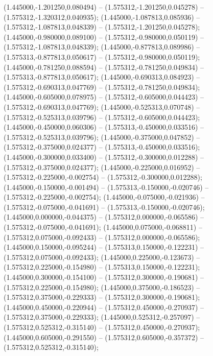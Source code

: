  (1.445000,-1.201250,0.080494) -- (1.575312,-1.201250,0.045278) -- (1.575312,-1.320312,0.040935);
 (1.445000,-1.087813,0.085936) -- (1.575312,-1.087813,0.048339) -- (1.575312,-1.201250,0.045278);
 (1.445000,-0.980000,0.089100) -- (1.575312,-0.980000,0.050119) -- (1.575312,-1.087813,0.048339);
 (1.445000,-0.877813,0.089986) -- (1.575313,-0.877813,0.050617) -- (1.575312,-0.980000,0.050119);
 (1.445000,-0.781250,0.088594) -- (1.575312,-0.781250,0.049834) -- (1.575313,-0.877813,0.050617);
 (1.445000,-0.690313,0.084923) -- (1.575312,-0.690313,0.047769) -- (1.575312,-0.781250,0.049834);
 (1.445000,-0.605000,0.078975) -- (1.575312,-0.605000,0.044423) -- (1.575312,-0.690313,0.047769);
 (1.445000,-0.525313,0.070748) -- (1.575312,-0.525313,0.039796) -- (1.575312,-0.605000,0.044423);
 (1.445000,-0.450000,0.060306) -- (1.575313,-0.450000,0.033516) -- (1.575312,-0.525313,0.039796);
 (1.445000,-0.375000,0.047852) -- (1.575312,-0.375000,0.024377) -- (1.575313,-0.450000,0.033516);
 (1.445000,-0.300000,0.033400) -- (1.575312,-0.300000,0.012288) -- (1.575312,-0.375000,0.024377);
 (1.445000,-0.225000,0.016952) -- (1.575312,-0.225000,-0.002754) -- (1.575312,-0.300000,0.012288);
 (1.445000,-0.150000,-0.001494) -- (1.575313,-0.150000,-0.020746) -- (1.575312,-0.225000,-0.002754);
 (1.445000,-0.075000,-0.021936) -- (1.575312,-0.075000,-0.041691) -- (1.575313,-0.150000,-0.020746);
 (1.445000,0.000000,-0.044375) -- (1.575312,0.000000,-0.065586) -- (1.575312,-0.075000,-0.041691);
 (1.445000,0.075000,-0.068811) -- (1.575312,0.075000,-0.092433) -- (1.575312,0.000000,-0.065586);
 (1.445000,0.150000,-0.095244) -- (1.575313,0.150000,-0.122231) -- (1.575312,0.075000,-0.092433);
 (1.445000,0.225000,-0.123673) -- (1.575312,0.225000,-0.154980) -- (1.575313,0.150000,-0.122231);
 (1.445000,0.300000,-0.154100) -- (1.575312,0.300000,-0.190681) -- (1.575312,0.225000,-0.154980);
 (1.445000,0.375000,-0.186523) -- (1.575312,0.375000,-0.229333) -- (1.575312,0.300000,-0.190681);
 (1.445000,0.450000,-0.220944) -- (1.575312,0.450000,-0.270937) -- (1.575312,0.375000,-0.229333);
 (1.445000,0.525312,-0.257097) -- (1.575312,0.525312,-0.315140) -- (1.575312,0.450000,-0.270937);
 (1.445000,0.605000,-0.291550) -- (1.575312,0.605000,-0.357372) -- (1.575312,0.525312,-0.315140);
